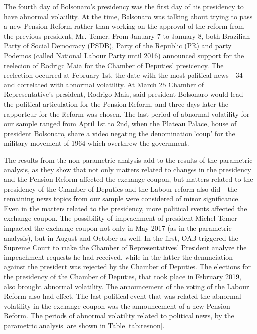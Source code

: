 \documentclass[cic,tc, english]{iiufrgs}
\begin{document}
    The fourth day of Bolsonaro's presidency was the first day of his presidency to have abnormal volatility. At the time, Bolsonaro was talking about trying to pass a new Pension Reform rather than working on the approval of the reform from the previous president, Mr. Temer. From January 7 to January 8, both Brazilian Party of Social Democracy (PSDB), Party of the Republic (PR) and party Podemos (called National Labour Party until 2016) announced support for the reelecion of Rodrigo Maia for the Chamber of Deputies' presidency. The reelection occurred at February 1st, the date with the most political news - 34 - and correlated with abnormal volatility. At March 25 Chamber of Representative's president, Rodrigo Maia, said president Bolsonaro would lead the political articulation for the Pension Reform, and three days later the rapporteur for the Reform was chosen. The last period of abnormal volatility for our sample ranged from April 1st to 2nd, when the Plateau Palace, house of president Bolsonaro, share a video negating the denomination 'coup' for the military movement of 1964 which overthrew the government.

    The results from the non parametric analysis add to the results of the parametric analysis, as they show that not only matters related to changes in the presidency and the Pension Reform affected the exchange coupon, but matters related to the presidency of the Chamber of Deputies and the Labour reform also did - the remaining news topics from our sample were considered of minor significance. Even in the matters related to the presidency, more political events affected the exchange coupon. The possibility of impeachment of president Michel Temer impacted the exchange coupon not only in May 2017 (as in the parametric analysis), but in August and October as well. In the first, OAB triggered the Supreme Court to make the Chamber of Representatives' President analyze the impeachment requests he had received, while in the latter the denunciation against the president was rejected by the Chamber of Deputies. The elections for the presidency of the Chamber of Deputies, that took place in February 2019, also brought abnormal volatility. The announcement of the voting of the Labour Reform also had effect. The last political event that was related the abnormal volatility in the exchange coupon was the announcement of a new Pension Reform. The periods of abnormal volatility related to political news, by the parametric analysis, are shown in Table \ref{tab:resnon}.
\end{document}
